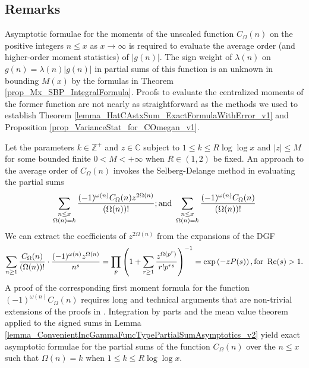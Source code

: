 \documentclass[11pt,reqno,a4letter]{article}
\newcommand{\hlocalref}[1]{\hyperref[#1]{\ref{#1}}}
\numberwithin{equation}{section}
\numberwithin{figure}{section}
\numberwithin{table}{section}
\theoremstyle{plain}
\numberwithin{theorem}{section}
\theoremstyle{definition}
\theoremstyle{remark}
\renewcommand{\Re}{\operatorname{Re}}
\newcommand{\mathtext}[1]{\text{\rm #1}}
\begin{document}
\subsection{Remarks} 
\label{subSection_RemarksOnAvgOrderFor_COmegan_directly_SelbergDelangeMethod} 

Asymptotic formulae for the moments of the unscaled function $C_{\Omega}(n)$ on the 
positive integers $n \leq x$ as $x \rightarrow \infty$ is required 
to evaluate the average order (and higher-order moment statistics) of $|g(n)|$. 
The sign weight of $\lambda(n)$ on $g(n) = \lambda(n) |g(n)|$ in partial sums of this 
function is an unknown in bounding $M(x)$ by the formulas in 
Theorem \hlocalref{prop_Mx_SBP_IntegralFormula}. 
Proofs to evaluate the centralized moments of the former function are not 
nearly as straightforward as the methods we used to establish 
Theorem \hlocalref{lemma_HatCAstxSum_ExactFormulaWithError_v1} and 
Proposition \hlocalref{prop_VarianceStat_for_COmegan_v1}. 

Let the parameters $k \in \mathbb{Z}^{+}$ and $z \in \mathbb{C}$ subject to 
$1 \leq k \leq R \log\log x$ and $|z| \leq M$ for some bounded finite 
$0 < M < +\infty$ when $R \in (1, 2)$ be fixed. 
An approach to the average order of $C_{\Omega}(n)$ 
invokes the Selberg-Delange method 
\cite[\S II.6.1]{TENENBAUM-PROBNUMT-METHODS} \cite[\S 7.4]{MV} 
in evaluating the partial sums 
\[
\sum_{\substack{n \leq x \\ \Omega(n)=k}} \frac{(-1)^{\omega(n)} 
     C_{\Omega}(n) z^{2\Omega(n)}}{(\Omega(n))!}; \mathtext{ and } 
     \sum_{\substack{n \leq x \\ \Omega(n)=k}} \frac{(-1)^{\omega(n)} 
     C_{\Omega}(n)}{(\Omega(n))!} 
\]
We can extract the coefficients of $z^{2\Omega(n)}$ 
from the expansions of the DGF 
\[
\sum_{n \geq 1} \frac{C_{\Omega}(n)}{(\Omega(n))!} \cdot 
     \frac{(-1)^{\omega(n)} z^{\Omega(n)}}{n^s} = \prod_p \left(1 + \sum_{r \geq 1} 
     \frac{z^{\Omega(p^r)}}{r! p^{rs}}\right)^{-1} 
     = \exp\left(-z P(s)\right), \mathtext{ for } \Re(s) > 1. 
\]
A proof of the corresponding first moment formula for the 
function $(-1)^{\omega(n)} C_{\Omega}(n)$ requires long and technical arguments 
that are non-trivial extensions of the proofs in 
\cite{MV,TENENBAUM-PROBNUMT-METHODS}. 
Integration by parts and the mean value theorem applied to the 
signed sums in Lemma \hlocalref{lemma_ConvenientIncGammaFuncTypePartialSumAsymptotics_v2} 
yield exact asymptotic formulae for the partial sums of 
the function $C_{\Omega}(n)$ over the $n \leq x$ such that $\Omega(n) = k$ 
when $1 \leq k \leq R \log\log x$. 
\end{document}
